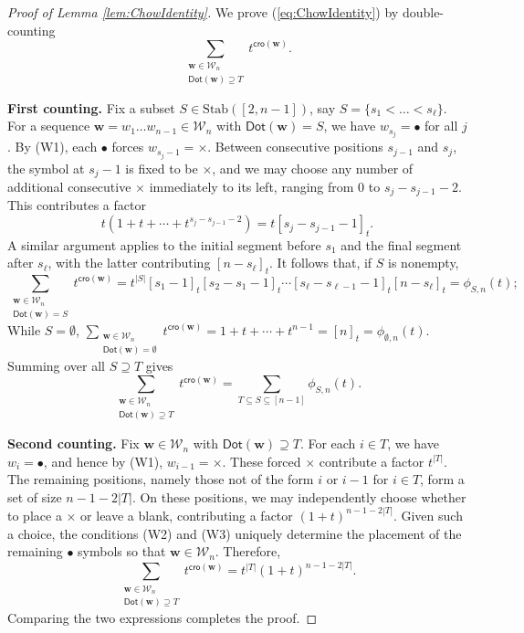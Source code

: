 \documentclass[reqno]{amsart}
\newcommand{\Stab}{{\mathrm{Stab}}}
\newcommand{\cro}{{\mathsf{cro}}}
\renewcommand{\Dot}{{\mathsf{Dot}}}
\theoremstyle{definition}
\theoremstyle{remark}
\begin{document}
\begin{proof}[Proof of Lemma \ref{lem:ChowIdentity}]
We prove (\ref{eq:ChowIdentity}) by double-counting
\[
\sum_{\substack{\mathbf{w}\in\mathcal{W}_n\\ \Dot(\mathbf{w})\supseteq T}} t^{\cro(\mathbf{w})}.
\]


\noindent \textbf{First counting.} Fix a subset $S\in\Stab([2,n-1])$, say $S=\{s_1<\ldots<s_\ell\}$.
For a sequence $\mathbf{w}=w_1\ldots w_{n-1}\in \mathcal{W}_n$ with $\Dot(\mathbf{w})=S$, we have $w_{s_{j}}=\bullet$ for all $j$. 
By (W1), each $\bullet$ forces $w_{s_j-1}=\times$. 
Between consecutive positions $s_{j-1}$ and $s_j$, the symbol at $s_j-1$ is fixed to be $\times$, and we may choose any number of additional consecutive $\times$ immediately to its left, ranging from $0$ to $s_j-s_{j-1}-2$. This contributes a factor
\[
t\left(1 + t + \cdots + t^{s_j-s_{j-1}-2}\right) = t[s_j-s_{j-1}-1]_t.
\]
A similar argument applies to the initial segment before $s_1$ and the final segment after $s_\ell$, with the latter contributing $[n-s_\ell]_t$.
It follows that, if $S$ is nonempty, 
\[
    \sum_{\substack{\mathbf{w}\in\mathcal{W}_n\\ \Dot(\mathbf{w})=S}}t^{\cro(\mathbf{w})}
    =
    t^{|S|}[s_1-1]_t[s_2-s_1-1]_t\cdots[s_\ell-s_{\ell-1}-1]_t[n-s_\ell]_t =\phi_{S,n}(t);
\]
While $S=\emptyset$, $\sum_{\substack{\mathbf{w}\in\mathcal{W}_n\\ \Dot(\mathbf{w})=\emptyset}}t^{\cro(\mathbf{w})}=1+t+\cdots+t^{n-1}=[n]_t=\phi_{\emptyset,n}(t)$.
Summing over all $S\supseteq T$ gives 
\[
    \sum_{\substack{\mathbf{w}\in\mathcal{W}_n\\ \Dot(\mathbf{w})\supseteq T}}t^{\cro(\mathbf{w})}=\sum_{T\subseteq S\subseteq [n-1]}\phi_{S,n}(t).
\]

\noindent \textbf{Second counting.} Fix $\mathbf{w}\in\mathcal{W}_n$ with $\Dot(\mathbf{w})\supseteq T$. For each $i\in T$, we have $w_i=\bullet$, and hence by (W1), $w_{i-1}=\times$. These forced $\times$ contribute a factor $t^{|T|}$.
The remaining positions, namely those not of the form $i$ or $i-1$ for $i\in T$, form a set of size $n-1-2|T|$. On these positions, we may independently choose whether to place a $\times$ or leave a blank, contributing a factor $(1+t)^{n-1-2|T|}$.
Given such a choice, the conditions (W2) and (W3) uniquely determine the placement of the remaining $\bullet$ symbols so that $\mathbf{w}\in\mathcal{W}_n$. Therefore,
\[
\sum_{\substack{\mathbf{w}\in\mathcal{W}_n\\ \Dot(\mathbf{w})\supseteq T}} t^{\cro(\mathbf{w})}
= t^{|T|}(1+t)^{n-1-2|T|}.
\]
Comparing the two expressions completes the proof.
\end{proof}
\end{document}
